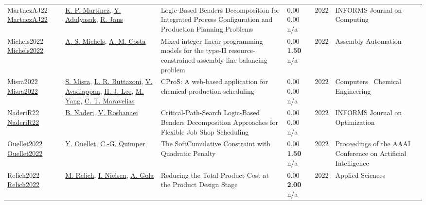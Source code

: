 {\begin{longtable}{p{3cm}p{5cm}p{10cm}p{1cm}rp{2.5cm}l}
MartnezAJ22 \href{http://dx.doi.org/10.1287/ijoc.2021.1079}{MartnezAJ22} & \hyperref[auth:a935]{K. P. Martínez}, \hyperref[auth:a936]{Y. Adulyasak}, \hyperref[auth:a841]{R. Jans} & Logic-Based Benders Decomposition for Integrated Process Configuration and Production Planning Problems & \noindent{}\textcolor{black!50}{0.00} \textcolor{black!50}{0.00} n/a & 2022 & \cellcolor{red!20}INFORMS Journal on Computing & \cite{MartnezAJ22}\\
Michels2022 \href{http://dx.doi.org/10.1108/aa-10-2021-0140}{Michels2022} & \hyperref[auth:a1551]{A. S. Michels}, \hyperref[auth:a1552]{A. M. Costa} & Mixed-integer linear programming models for the type-II resource-constrained assembly line balancing problem & \noindent{}\textcolor{black!50}{0.00} \textbf{1.50} n/a & 2022 & Assembly Automation & \cite{Michels2022}\\
Misra2022 \href{http://dx.doi.org/10.1016/j.compchemeng.2022.107895}{Misra2022} & \hyperref[auth:a1802]{S. Misra}, \hyperref[auth:a1803]{L. R. Buttazoni}, \hyperref[auth:a1804]{V. Avadiappan}, \hyperref[auth:a1805]{H. J. Lee}, \hyperref[auth:a1806]{M. Yang}, \hyperref[auth:a381]{C. T. Maravelias} & CProS: A web-based application for chemical production scheduling & \noindent{}\textcolor{black!50}{0.00} \textcolor{black!50}{0.00} n/a & 2022 & Computers \  Chemical Engineering & \cite{Misra2022}\\
NaderiR22 \href{http://dx.doi.org/10.1287/ijoo.2021.0056}{NaderiR22} & \hyperref[auth:a726]{B. Naderi}, \hyperref[auth:a728]{V. Roshanaei} & Critical-Path-Search Logic-Based Benders Decomposition Approaches for Flexible Job Shop Scheduling & \noindent{}\textcolor{black!50}{0.00} \textcolor{black!50}{0.00} n/a & 2022 & \cellcolor{red!20}INFORMS Journal on Optimization & \cite{NaderiR22}\\
Ouellet2022 \href{http://dx.doi.org/10.1609/aaai.v36i4.20296}{Ouellet2022} & \hyperref[auth:a52]{Y. Ouellet}, \hyperref[auth:a37]{C.-G. Quimper} & The SoftCumulative Constraint with Quadratic Penalty & \noindent{}\textcolor{black!50}{0.00} \textbf{1.50} n/a & 2022 & Proceedings of the AAAI Conference on Artificial Intelligence & \cite{Ouellet2022}\\
Relich2022 \href{http://dx.doi.org/10.3390/app12041921}{Relich2022} & \hyperref[auth:a1646]{M. Relich}, \hyperref[auth:a1705]{I. Nielsen}, \hyperref[auth:a1815]{A. Gola} & \cellcolor{gold!20}Reducing the Total Product Cost at the Product Design Stage & \noindent{}\textcolor{black!50}{0.00} \textbf{2.00} n/a & 2022 & Applied Sciences & \cite{Relich2022}\\

\end{longtable}}
